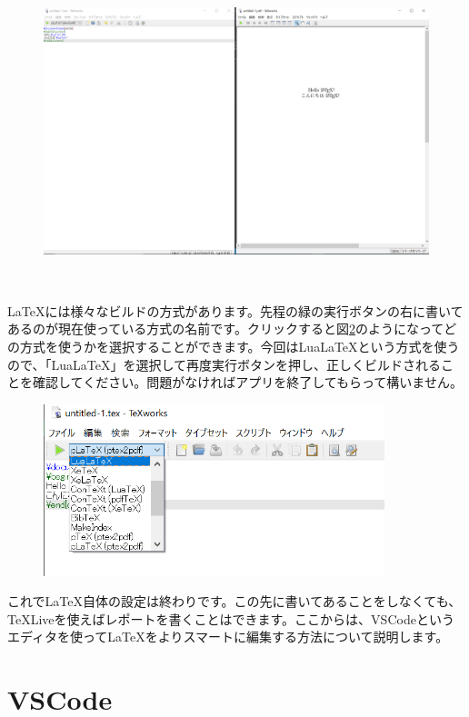 \begin{figure}[H]
    \centering
    \includegraphics[height=90mm]{img/texworks.png}
    \caption{}
    \label{fig:texworks1}
\end{figure}
\LaTeX には様々なビルドの方式があります。先程の緑の実行ボタンの右に書いてあるのが現在使っている方式の名前です。クリックすると図\ref{fig:texworks2}のようになってどの方式を使うかを選択することができます。今回はLua\LaTeX という方式を使うので、「LuaLaTeX」を選択して再度実行ボタンを押し、正しくビルドされることを確認してください。問題がなければアプリを終了してもらって構いません。

\begin{figure}[H]
    \centering
    \includegraphics[height=50mm]{img/texworks2.png}
    \caption{}
    \label{fig:texworks2}
\end{figure}
これで\LaTeX 自体の設定は終わりです。この先に書いてあることをしなくても、\TeX Liveを使えばレポートを書くことはできます。ここからは、VSCodeというエディタを使って\LaTeX をよりスマートに編集する方法について説明します。

\section{VSCode}\label{sec:VSCode}
